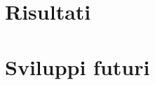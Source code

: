 \documentclass[conference, italian]{IEEEtran}
\begin{document}
\section{Risultati}\label{sec:conclusion}
\section{Sviluppi futuri}\label{sec:future-works}

\balance\printbibliography\vspace{12pt}
\end{document}

